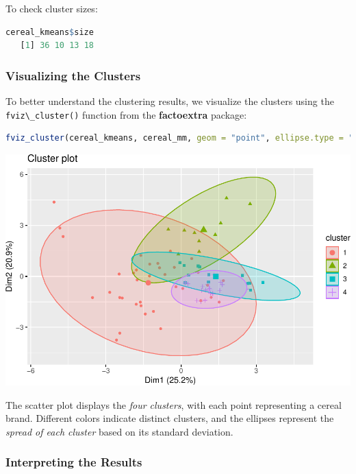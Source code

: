 \documentclass[
]{book}
\newcommand{\passthrough}[1]{#1}
\theoremstyle{definition}
\theoremstyle{definition}
\theoremstyle{definition}
\theoremstyle{definition}
\theoremstyle{remark}
\begin{document}
To check cluster sizes:

\begin{lstlisting}[language=R]
cereal_kmeans$size
   [1] 36 10 13 18
\end{lstlisting}

\subsubsection*{Visualizing the Clusters}\label{visualizing-the-clusters}

To better understand the clustering results, we visualize the clusters using the \passthrough{\lstinline!fviz\_cluster()!} function from the \textbf{factoextra} package:

\begin{lstlisting}[language=R]
fviz_cluster(cereal_kmeans, cereal_mm, geom = "point", ellipse.type = "norm", palette = "custom_palette")
\end{lstlisting}

\begin{center}\includegraphics{clustering_files/figure-latex/unnamed-chunk-14-1} \end{center}

The scatter plot displays the \emph{four clusters}, with each point representing a cereal brand. Different colors indicate distinct clusters, and the ellipses represent the \emph{spread of each cluster} based on its standard deviation.

\subsubsection*{Interpreting the Results}\label{interpreting-the-results}
\end{document}
